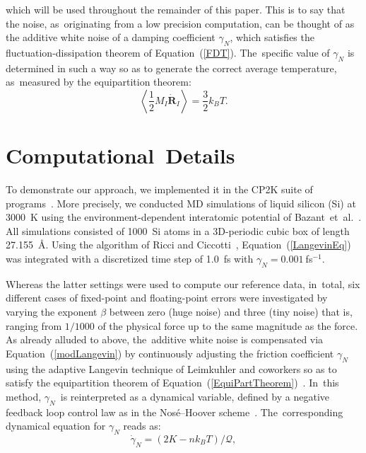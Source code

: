 \documentclass[computation,article,accept,moreauthors,pdftex]{Definitions/mdpi}
\begin{document}
\noindent which will be used throughout the remainder of this paper. This is to say that the noise, as~originating from a low precision computation, can be thought of as the additive white noise {of a damping coefficient} $\gamma_N$, which satisfies the fluctuation-dissipation theorem of Equation~(\ref{FDT}). The~specific value of $\gamma_N$ is determined in such a way so as to generate the correct average temperature, as~measured by the equipartition theorem:
\begin{equation}
\left\langle \frac{1}{2} M_I \dot{\textbf{R}}_{I} \right\rangle = \frac{3}{2} k_B T.
\label{EquiPartTheorem}
\end{equation}


\section{Computational~Details}
\label{sec:computational}
To demonstrate our approach, we implemented it in the CP2K suite of programs~\cite{CP2Ka, CP2Kb}. More precisely, we conducted MD simulations of liquid silicon (Si) at 3000~K using the environment-dependent interatomic potential of Bazant~et~al.~\cite{EIP1,EIP2}.
All simulations consisted of 1000~Si atoms in a 3D-periodic cubic box of length 27.155~\AA. Using the algorithm of Ricci and Ciccotti~\cite{Ricci}, Equation~(\ref{LangevinEq}) was integrated with a discretized time step of 1.0~fs with $\gamma_N = 0.001~$fs$^{-1}$.

Whereas the latter settings were used to compute our reference data, in~total, six different cases of fixed-point and floating-point errors were investigated by varying the exponent $\beta$ between zero (huge noise) and three (tiny noise) that is, ranging from $1/1000$ of the physical force up to the same magnitude as the force.
As already alluded to above, the~additive white noise is compensated via Equation~(\ref{modLangevin}) by %
continuously adjusting the friction coefficient $\gamma_N$ using the adaptive Langevin technique of Leimkuhler and coworkers so as to satisfy the equipartition theorem of Equation~(\ref{EquiPartTheorem})~\cite{JonesLeimkuhler2011, Mones2015, LeimkuhlerStoltz2019}. In~this method, $\gamma_N$~is reinterpreted as a dynamical variable, defined by a negative feedback loop control law as in the Nos\'e--Hoover scheme~\cite{Nose,Hoover}. The~corresponding dynamical equation for $\gamma_N$ reads as:
\begin{equation}
 \dot{\gamma}_N= (2K-n k_B T)/\mathcal{Q},
\end{equation}
\end{document}
